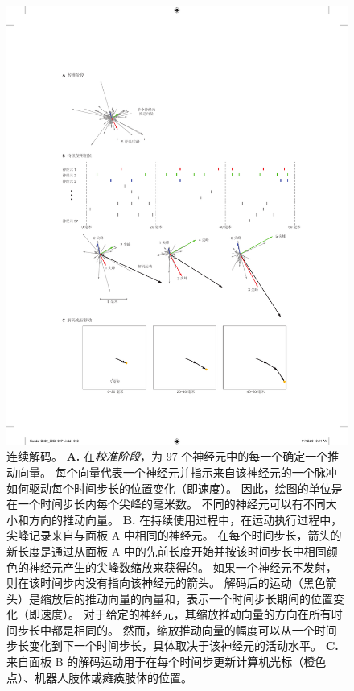 \begin{figure}[htbp]
	\centering
	\includegraphics[width=1.0\linewidth]{chap39/fig_39_6}
	\caption{连续解码。
		\textbf{A.} 在\textit{校准阶段}，为 97 个神经元中的每一个确定一个推动向量。
		每个向量代表一个神经元并指示来自该神经元的一个脉冲如何驱动每个时间步长的位置变化（即速度）。
		因此，绘图的单位是在一个时间步长内每个尖峰的毫米数。
		不同的神经元可以有不同大小和方向的推动向量。
		\textbf{B.} 在持续使用过程中，在运动执行过程中，尖峰记录来自与面板 A 中相同的神经元。
		在每个时间步长，箭头的新长度是通过从面板 A 中的先前长度开始并按该时间步长中相同颜色的神经元产生的尖峰数缩放来获得的。
		如果一个神经元不发射，则在该时间步内没有指向该神经元的箭头。
		解码后的运动（黑色箭头）是缩放后的推动向量的向量和，表示一个时间步长期间的位置变化（即速度）。
		对于给定的神经元，其缩放推动向量的方向在所有时间步长中都是相同的。
		然而，缩放推动向量的幅度可以从一个时间步长变化到下一个时间步长，具体取决于该神经元的活动水平。
		\textbf{C.} 来自面板 B 的解码运动用于在每个时间步更新计算机光标（橙色点）、机器人肢体或瘫痪肢体的位置。}
	\label{fig:39_6}
\end{figure}


